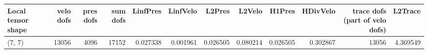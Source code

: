 \begin{tabular}{lrrrrrrrrrrr}
\toprule
Local tensor shape &  velo dofs &  pres dofs &  sum dofs &  LinfPres &  LinfVelo &   L2Pres &   L2Velo &   H1Pres &  HDivVelo &  trace dofs (part of velo dofs) &  L2Trace \\
\midrule
            (7, 7) &      13056 &       4096 &     17152 &  0.027338 &  0.001961 & 0.026505 & 0.080214 & 0.026505 &  0.302867 &                           13056 & 4.369549 \\
\bottomrule
\end{tabular}
